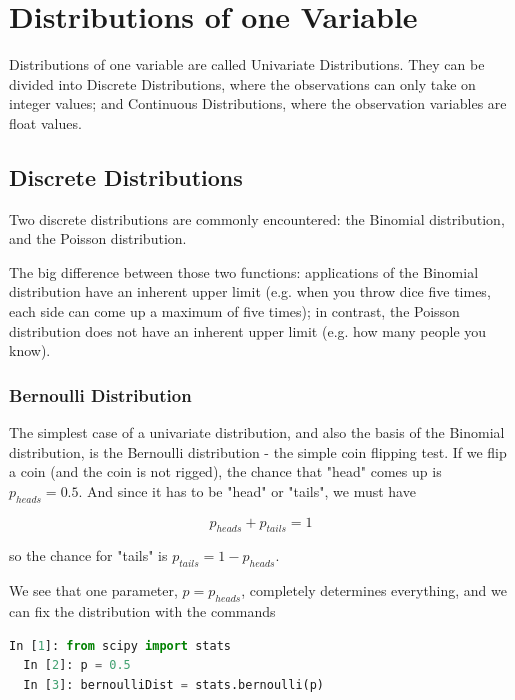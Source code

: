 \chapter{Distributions of one Variable}


Distributions of one variable are called Univariate Distributions. They can be divided into Discrete Distributions, where the observations can only take on integer values; and Continuous Distributions, where the observation variables are float values.

\section{Discrete Distributions}

Two discrete distributions are commonly encountered: the Binomial distribution, and the Poisson distribution.

The big difference between those two functions: applications of the Binomial distribution have an inherent upper limit (e.g. when you throw dice five times, each side can come up a maximum of five times); in contrast, the Poisson distribution does not have an inherent upper limit (e.g. how many people you know).

\subsection{Bernoulli Distribution}

The simplest case of a univariate distribution, and also the basis of the Binomial distribution, is the Bernoulli distribution - the simple coin flipping test. If we flip a coin (and the coin is not rigged), the chance that "head" comes up is $p_{heads}=0.5$. And since it has to be "head" or "tails", we must have

\begin{equation}\label{eq:Bernoulli}
  p_{heads} + p_{tails} = 1
\end{equation}

so the chance for "tails" is $p_{tails} = 1-p_{heads}$.

We see that one parameter, $p=p_{heads}$, completely determines everything, and we can fix the distribution with the commands

\begin{lstlisting}[language=Python]
  In [1]: from scipy import stats
  In [2]: p = 0.5
  In [3]: bernoulliDist = stats.bernoulli(p)
\end{lstlisting}


